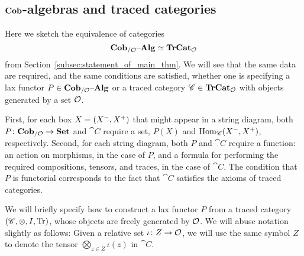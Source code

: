 \documentclass[11pt,oneside,article]{memoir}
\begin{document}
\subsection{$\mathbf{Cob}$-algebras and traced categories}
      \label{subsec:cobalg_and_trCat}

Here we sketch the equivalence of categories
\[
   \mathbf{Cob}_{/\mathcal{O}}{\text \textendash}\mathbf{Alg}\simeq\mathbf{TrCat}_{\mathcal{O}}
\]
from Section~\ref{subsec:statement_of_main_thm}. We will see that the same data are required, and
the same conditions are satisfied, whether one is specifying a lax functor $P\in\mathbf{Cob}_{/\mathcal{O}}{\text \textendash}\mathbf{Alg}$
or a traced category $\mathscr{C}\in\mathbf{TrCat}_{\mathcal{O}}$ with objects generated by a set $\mathcal{O}$.

First, for each box $X=(X^-,X^+)$ that might appear in a string diagram, both
$P\colon\mathbf{Cob}_{/\mathcal{O}}\to\mathbf{Set}$ and $\cat{C}$ require a set, $P(X)$ and
$\operatorname{Hom}_{\mathscr{C}}(X^-,X^+)$, respectively. Second, for each string diagram, both $P$ and
$\cat{C}$ require a function: an action on morphisms, in the case of $P$, and a formula for
performing the required compositions, tensors, and traces, in the case of $\cat{C}$. The condition
that $P$ is functorial corresponds to the fact that $\cat{C}$ satisfies the axioms of traced
categories.

We will briefly specify how to construct a lax functor $P$ from a traced category
$(\mathscr{C},\otimes,I,\operatorname{Tr})$, whose objects are freely generated by $\mathcal{O}$. We will abuse notation
slightly as follows: Given a relative set $\iota\colon Z\to\mathcal{O}$, we will use the same symbol $Z$
to denote the tensor $\bigotimes_{z\in Z}\iota(z)$ in $\cat{C}$.
\end{document}
